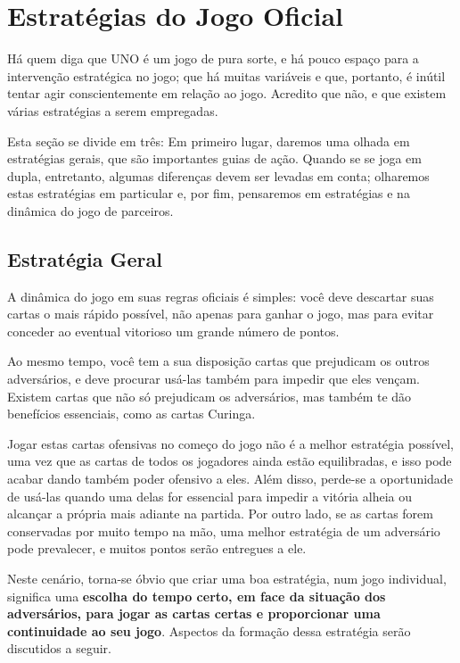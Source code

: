 \chapter{Estratégias do Jogo Oficial} 

Há quem diga que UNO é um jogo de pura sorte, e há pouco espaço para a intervenção estratégica no jogo; que há muitas variáveis e que, portanto, é inútil tentar agir conscientemente em relação ao jogo. Acredito que não, e que existem várias estratégias a serem empregadas.

Esta seção se divide em três: Em primeiro lugar, daremos uma olhada em estratégias gerais, que são importantes guias de ação. Quando se se joga em dupla, entretanto, algumas diferenças devem ser levadas em conta; olharemos estas estratégias em particular e, por fim, pensaremos em estratégias e na dinâmica do jogo de parceiros.

\section{Estratégia Geral}

A dinâmica do jogo em suas regras oficiais é simples: você deve descartar suas cartas o mais rápido possível, não apenas para ganhar o jogo, mas para evitar conceder ao eventual vitorioso um grande número de pontos.

Ao mesmo tempo, você tem a sua disposição cartas que prejudicam os outros adversários, e deve procurar usá-las também para impedir que eles vençam. Existem cartas que não só prejudicam os adversários, mas também te dão benefícios essenciais, como as cartas Curinga.

Jogar estas cartas ofensivas no começo do jogo não é a melhor estratégia possível, uma vez que as cartas de todos os jogadores ainda estão equilibradas, e isso pode acabar dando também poder ofensivo a eles. Além disso, perde-se a oportunidade de usá-las quando uma delas for essencial para impedir a vitória alheia ou alcançar a própria mais adiante na partida. Por outro lado, se as cartas forem conservadas por muito tempo na mão, uma melhor estratégia de um adversário pode prevalecer, e muitos pontos serão entregues a ele.

Neste cenário, torna-se óbvio que criar uma boa estratégia, num jogo individual, significa uma \textbf{escolha do tempo certo, em face da situação dos adversários, para jogar as cartas certas e proporcionar uma continuidade ao seu jogo}. Aspectos da formação dessa estratégia serão discutidos a seguir.

